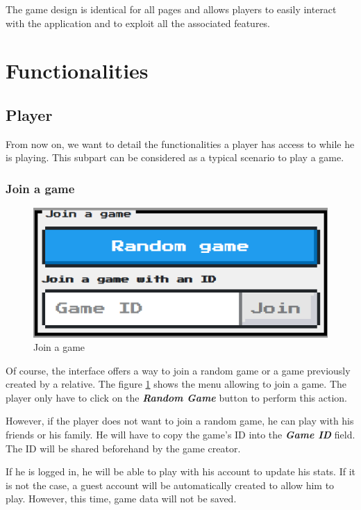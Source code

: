 \documentclass{tnreport}
\begin{document}
The game design is identical for all pages and allows players to easily interact with the application and to exploit all the associated features. 

\section{Functionalities}

\subsection{Player}

From now on, we want to detail the functionalities a player has access to while he is playing. This subpart can be considered as a typical scenario to play a game. 

\subsubsection{Join a game}

\begin{figure}
	\centering
	\includegraphics[scale=0.7]{figures/random_game}
	\caption{Join a game}
	\label{fig:join_game}
	\vspace*{-1cm}
\end{figure}

Of course, the interface offers a way to join a random game or a game previously created by a relative. The figure \ref{fig:join_game} shows the menu allowing to join a game. The player only have to click on the \textit{\textbf{Random Game}} button to perform this action. 

However, if the player does not want to join a random game, he can play with his friends or his family. He will have to copy the game's ID into the \textbf{\textit{Game ID}} field. The ID will be shared beforehand by the game creator. 

If he is logged in, he will be able to play with his account to update his stats. If it is not the case, a guest account will be automatically created to allow him to play. However, this time, game data will not be saved. 
\end{document}
